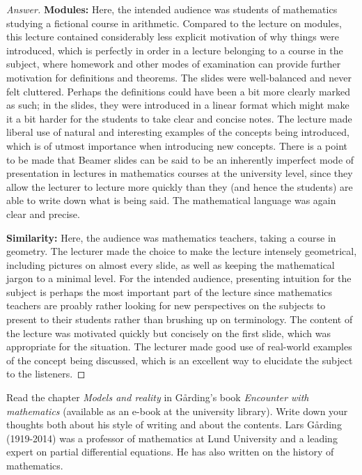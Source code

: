 \begin{proof}[Answer]
\textbf{Modules:} Here, the intended audience was students of mathematics studying a fictional course in arithmetic. Compared to the lecture on modules, this lecture contained considerably less explicit motivation of why things were introduced, which is perfectly in order in a lecture belonging to a course in the subject, where homework and other modes of examination can provide further motivation for definitions and theorems. The slides were well-balanced and never felt cluttered. Perhaps the definitions could have been a bit more clearly marked as such; in the slides, they were introduced in a linear format which might make it a bit harder for the students to take clear and concise notes. The lecture made liberal use of natural and interesting examples of the concepts being introduced, which is of utmost importance when introducing new concepts. There is a point to be made that Beamer slides can be said to be an inherently imperfect mode of presentation in lectures in mathematics courses at the university level, since they allow the lecturer to lecture more quickly than they (and hence the students) are able to write down what is being said. The mathematical language was again clear and precise.


\textbf{Similarity:} Here, the audience was mathematics teachers, taking a course in geometry. The lecturer made the choice to make the lecture intensely geometrical, including pictures on almost every slide, as well as keeping the mathematical jargon to a minimal level. For the intended audience, presenting intuition for the subject is perhaps the most important part of the lecture since mathematics teachers are proably rather looking for new perspectives on the subjects to present to their students rather than brushing up on terminology. The content of the lecture was motivated quickly but concisely on the first slide, which was appropriate for the situation. The lecturer made good use of real-world examples of the concept being discussed, which is an excellent way to elucidate the subject to the listeners.



\end{proof}

\newpage
{}


\begin{assignment}
  Read the chapter \emph{Models and reality} in Gårding’s book \emph{Encounter with
  mathematics} (available as an e-book at the university library). Write down
  your thoughts both about his style of writing and about the contents. Lars
  Gårding (1919-2014) was a professor of mathematics at Lund University
  and a leading expert on partial differential equations. He has also written
  on the history of mathematics.
\end{assignment}

